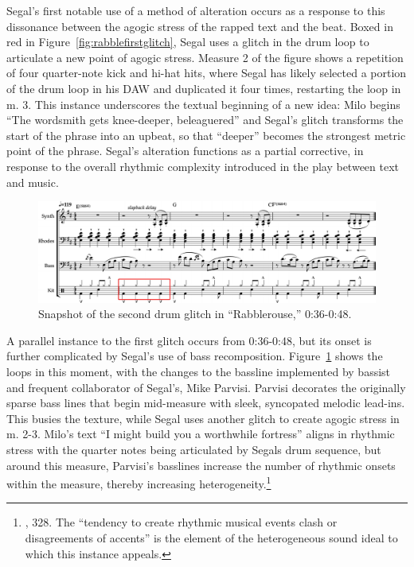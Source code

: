 Segal's first notable use of a method of alteration occurs as a response to this dissonance between the agogic stress of the rapped text and the beat. Boxed in red in Figure~\ref{fig:rabblefirstglitch}, Segal uses a glitch in the drum loop to articulate a new point of agogic stress. Measure 2 of the figure shows a repetition of four quarter-note kick and hi-hat hits, where Segal has likely selected a portion of the drum loop in his DAW and duplicated it four times, restarting the loop in m. 3. This instance underscores the textual beginning of a new idea: Milo begins ``The wordsmith gets knee-deeper, beleaguered'' and Segal's glitch transforms the start of the phrase into an upbeat, so that ``deeper'' becomes the strongest metric point of the phrase. Segal's alteration functions as a partial corrective, in response to the overall rhythmic complexity introduced in the play between text and music.

    \begin{figure}[ht]
        \centering
        \includegraphics[width=\textwidth]{images/figures/chp 02/036048rabblesecondglitch.pdf}
        \caption{Snapshot of the second drum glitch in ``Rabblerouse,'' 0:36-0:48.}
        \label{fig:rabblesecondglitch}
    \end{figure}

A parallel instance to the first glitch occurs from 0:36-0:48, but its onset is further complicated by Segal's use of bass recomposition. Figure~\ref{fig:rabblesecondglitch} shows the loops in this moment, with the changes to the bassline implemented by bassist and frequent collaborator of Segal's, Mike Parvisi. Parvisi decorates the originally sparse bass lines that begin mid-measure with sleek, syncopated melodic lead-ins. This busies the texture, while Segal uses another glitch to create agogic stress in m. 2-3. Milo's text \textemdash  ``I might build you a worthwhile fortress'' \textemdash  aligns in rhythmic stress with the quarter notes being articulated by Segals drum sequence, but around this measure, Parvisi's basslines increase the number of rhythmic onsets within the measure, thereby increasing heterogeneity.\footnote{\cite{ollywilsonHeterogeneousSoundIdeal1992}, 328. The ``tendency to create rhythmic musical events clash or disagreements of accents'' is the element of the heterogeneous sound ideal to which this instance appeals.}

